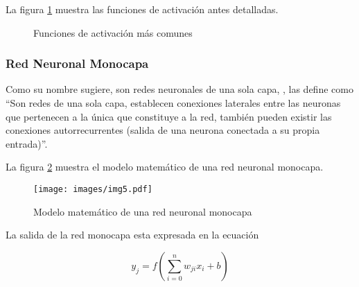     La figura \ref{fig:act_fun} muestra las funciones de activación antes detalladas.\\


    \begin{figure}[hb!]
        \centering
            \hspace{0.01\linewidth}
            \hspace{0.01\linewidth}
            \hspace{0.01\linewidth}
        \caption{Funciones de activación más comunes}
        \label{fig:act_fun}
    \end{figure}

    
    \pagebreak[2cm]
    \subsubsection{Red Neuronal Monocapa}

    Como su nombre sugiere, son redes neuronales de una sola capa, \citet[p.16]{bib13}, las define como ``Son redes de una sola capa, establecen conexiones laterales entre las neuronas que pertenecen a la única que constituye a la red, también pueden existir las conexiones autorrecurrentes (salida de una neurona conectada a su propia entrada)''.

    La figura \ref{fig:red_mono} muestra el modelo matemático de una red neuronal monocapa.

    \begin{figure}[!ht]
        \centering
        \texttt{[image: images/img5.pdf]}
        \caption{Modelo matemático de una red neuronal monocapa}
        \label{fig:red_mono}
    \end{figure}
    
    La salida de la red monocapa esta expresada en la ecuación

    \begin{equation}
        y_j = f(\sum_{i = 0}^{n}w_{ji}x_i + b)
        \label{eq:red_mono}
    \end{equation}

